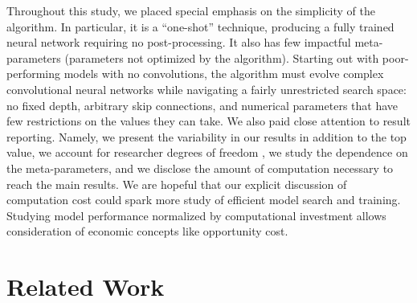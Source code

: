 \documentclass{article}
\renewcommand{\cite}[1]{\citep{#1}}
\begin{document}
Throughout this study, we placed special emphasis on the simplicity of the algorithm. In particular, it is a ``one-shot'' technique, producing a fully trained neural network requiring no post-processing. It also has few impactful meta-parameters (\ie parameters not optimized by the algorithm). Starting out with poor-performing models with no convolutions, the algorithm must evolve complex convolutional neural networks while navigating a fairly unrestricted search space: no fixed depth, arbitrary skip connections, and numerical parameters that have few restrictions on the values they can take. We also paid close attention to result reporting. Namely, we present the variability in our results in addition to the top value, we account for researcher degrees of freedom \cite{simmons2011false}, we study the dependence on the meta-parameters, and we disclose the amount of computation necessary to reach the main results. We are hopeful that our explicit discussion of computation cost could spark more study of efficient model search and training. Studying model performance normalized by computational investment allows consideration of economic concepts like opportunity cost.

\section{Related Work}
\end{document}
